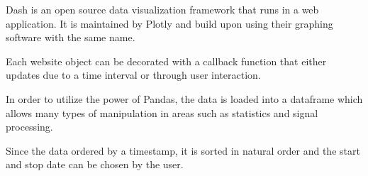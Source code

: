 Dash is an open source data visualization framework that runs in a web application. It is maintained by Plotly and build upon using their graphing software with the same name.

Each website object can be decorated with a callback function that either updates due to a time interval or through user interaction.

In order to utilize the power of Pandas, the data is loaded into a dataframe which allows many types of manipulation in areas such as statistics and signal processing.

Since the data ordered by a timestamp, it is sorted in natural order and the start and stop date can be chosen by the user.
